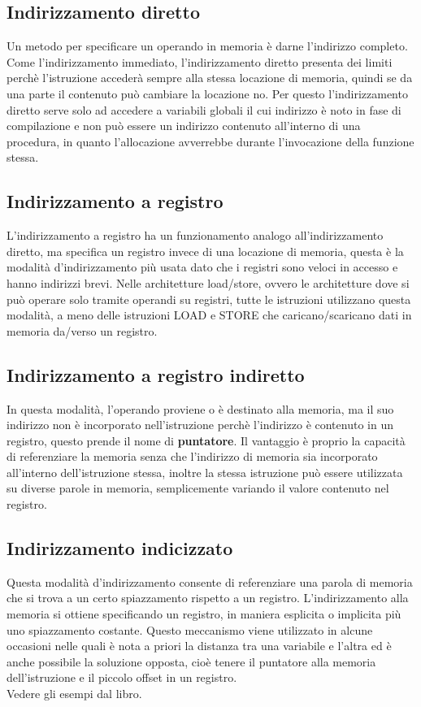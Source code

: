 \documentclass[12pt]{report}
\begin{document}
		\subsection{Indirizzamento diretto}
		Un metodo per specificare un operando in memoria è darne l'indirizzo completo. Come l'indirizzamento immediato, l'indirizzamento diretto presenta dei limiti perchè l'istruzione accederà sempre alla stessa locazione di memoria, quindi se da una parte il contenuto può cambiare la locazione no. Per questo l'indirizzamento diretto serve solo ad accedere a variabili globali il cui indirizzo è noto in fase di compilazione e non può essere un indirizzo contenuto all'interno di una procedura, in quanto l'allocazione avverrebbe durante l'invocazione della funzione stessa.
		\subsection{Indirizzamento a registro}
		L'indirizzamento a registro ha un funzionamento analogo all'indirizzamento diretto, ma specifica un registro invece di una locazione di memoria, questa è la modalità d'indirizzamento più usata dato che i registri sono veloci in accesso e hanno indirizzi brevi.
		Nelle architetture load/store, ovvero le architetture dove si può operare solo tramite operandi su registri, tutte le istruzioni utilizzano questa modalità, a meno delle istruzioni LOAD e STORE che caricano/scaricano dati in memoria da/verso un registro.
		\subsection{Indirizzamento a registro indiretto}
		In questa modalità, l'operando proviene o è destinato alla memoria, ma il suo indirizzo non è incorporato nell'istruzione perchè l'indirizzo è contenuto in un registro, questo prende il nome di \textbf{puntatore}. Il vantaggio è proprio la capacità di referenziare la memoria senza che l'indirizzo di memoria sia incorporato all'interno dell'istruzione stessa, inoltre la stessa istruzione può essere utilizzata su diverse parole in memoria, semplicemente variando il valore contenuto nel registro.
		\subsection{Indirizzamento indicizzato}
		Questa modalità d'indirizzamento consente di referenziare una parola di memoria che si trova a un certo spiazzamento rispetto a un registro.
		L'indirizzamento alla memoria si ottiene specificando un registro, in maniera esplicita o implicita più uno spiazzamento costante. Questo meccanismo viene utilizzato in alcune occasioni nelle quali è nota a priori la distanza tra una variabile e l'altra ed è anche possibile la soluzione opposta, cioè tenere il puntatore alla memoria dell'istruzione e il piccolo offset in un registro. \\
		Vedere gli esempi dal libro.
\end{document}
